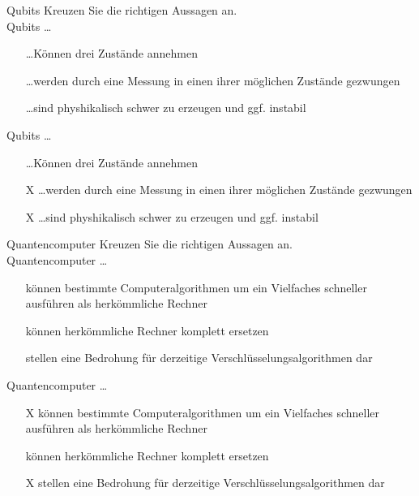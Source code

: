 \begin{aufgabe}[Quantencomputer]{Qubits}
    Kreuzen Sie die richtigen Aussagen an.\\
    Qubits \ldots
    \begin{itemize}
        \item [ ] \ldots Können drei Zustände annehmen
        \item [ ] \ldots werden durch eine Messung in einen ihrer möglichen Zustände gezwungen
        \item [ ] \ldots sind physhikalisch schwer zu erzeugen und ggf. instabil
    \end{itemize}
    \tcblower
    Qubits \ldots
    \begin{itemize}
        \item [ ] \ldots Können drei Zustände annehmen
        \item [X] \ldots werden durch eine Messung in einen ihrer möglichen Zustände gezwungen
        \item [X] \ldots sind physhikalisch schwer zu erzeugen und ggf. instabil
    \end{itemize}
\end{aufgabe}

\begin{aufgabe}{Quantencomputer}
    Kreuzen Sie die richtigen Aussagen an.\\
    Quantencomputer \ldots
    \begin{itemize}
        \item [ ] können bestimmte Computeralgorithmen um ein Vielfaches schneller ausführen als herkömmliche Rechner
        \item [ ] können herkömmliche Rechner komplett ersetzen
        \item [ ] stellen eine Bedrohung für derzeitige Verschlüsselungsalgorithmen dar
    \end{itemize}
    \tcblower
    Quantencomputer \ldots
    \begin{itemize}
        \item [X] können bestimmte Computeralgorithmen um ein Vielfaches schneller ausführen als herkömmliche Rechner
        \item [ ] können herkömmliche Rechner komplett ersetzen
        \item [X] stellen eine Bedrohung für derzeitige Verschlüsselungsalgorithmen dar
    \end{itemize}
\end{aufgabe}
